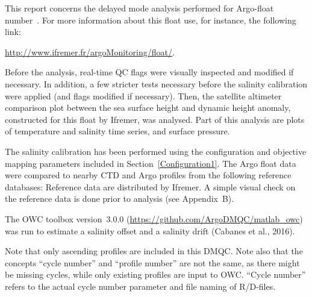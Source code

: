 \documentclass{article}
\begin{document}
This report concerns the delayed mode analysis performed for Argo-float
number~\WMOnum. For more information about this float use, for instance,
the following link:
\begin{center}
\href{url}{http://www.ifremer.fr/argoMonitoring/float/\WMOnum}.  
\end{center}
Before the analysis, real-time QC flags were visually inspected and
modified if necessary.  In addition, a few stricter tests necessary before
the salinity calibration were applied (and flags modified if necessary).
%
Then, the satellite altimeter comparison plot between the sea surface
height and dynamic height anomaly, constructed for this float by Ifremer,
was analysed.
%
Part of this analysis are plots of temperature and salinity time
series, and surface pressure. %



The salinity calibration has been performed using the configuration and objective
mapping parameters included in Section~\ref{Configuration1}.
The Argo float data were compared to nearby CTD and Argo profiles from the
following reference databases: \small{{}} Reference
data are distributed by Ifremer.  A simple visual check on the reference
data is done prior to analysis (see Appendix~B).

The OWC toolbox version~3.0.0 %
(\href{url}{https://github.com/ArgoDMQC/matlab\_owc}) was run to estimate
a salinity offset and a salinity drift (Cabanes et al., 2016).

Note that only ascending profiles are included in this DMQC. Note also
that the concepts ``cycle number'' and ``profile number'' are not the
same, as there might be missing cycles, while only existing profiles are
input to OWC. ``Cycle number'' refers to the actual cycle number
parameter and file naming of R/D-files.
\end{document}
